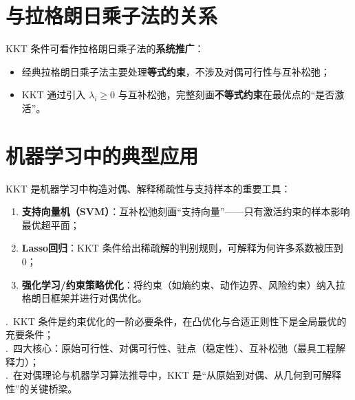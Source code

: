 \documentclass[12pt,a4paper]{ctexart}
\theoremstyle{definition}
\theoremstyle{plain}
\begin{document}
	\section{与拉格朗日乘子法的关系}
	KKT 条件可看作拉格朗日乘子法的\textbf{系统推广}：
	\begin{itemize}
		\item 经典拉格朗日乘子法主要处理\textbf{等式约束}，不涉及对偶可行性与互补松弛；
		\item KKT 通过引入 $\lambda_i\ge 0$ 与互补松弛，完整刻画\textbf{不等式约束}在最优点的“是否激活”。
	\end{itemize}
	
	\section{机器学习中的典型应用}
	KKT 是机器学习中构造对偶、解释稀疏性与支持样本的重要工具：
	\begin{enumerate}
		\item \textbf{支持向量机（SVM）}：互补松弛刻画“支持向量”——只有激活约束的样本影响最优超平面；
		\item \textbf{Lasso回归}：KKT 条件给出稀疏解的判别规则，可解释为何许多系数被压到 0；
		\item \textbf{强化学习/约束策略优化}：将约束（如熵约束、动作边界、风险约束）纳入拉格朗日框架并进行对偶优化。
	\end{enumerate}
	
	\begin{tcolorbox}[title={核心总结}]
		.\ KKT 条件是约束优化的一阶必要条件，在凸优化与合适正则性下是全局最优的充要条件；\\
		.\ 四大核心：原始可行性、对偶可行性、驻点（稳定性）、互补松弛（最具工程解释力）；\\
		.\ 在对偶理论与机器学习算法推导中，KKT 是“从原始到对偶、从几何到可解释性”的关键桥梁。
	\end{tcolorbox}
	
\end{document}

